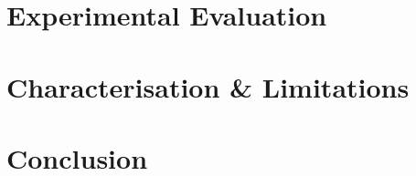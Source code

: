 \documentclass[letterpaper, 10 pt, conference]{ieeeconf}
\begin{document}
\section{Experimental Evaluation}
  \label{section:results}
  

\section{Characterisation \& Limitations}
  \label{section:characterisation}
  

\section{Conclusion}
  \label{section:finale}
  


\cleardoublepage




\balance
\end{document}

